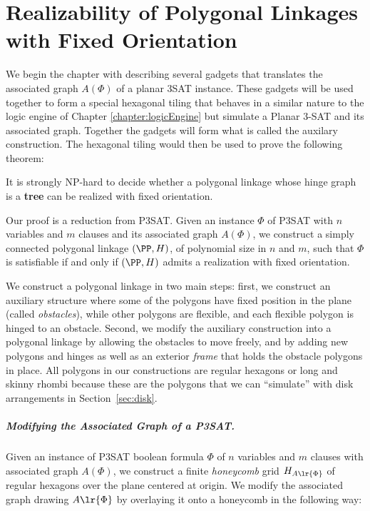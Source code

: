 \chapter{Realizability of Polygonal Linkages with Fixed Orientation\label{chapter:polygonalLinkage}}

We begin the chapter with describing several gadgets that translates the associated graph $A(\Phi)$ of a planar 3SAT instance.  
These gadgets will be used together to form a special hexagonal tiling that behaves in a similar nature to the logic engine of Chapter \ref{chapter:logicEngine} but simulate a Planar 3-SAT and its associated graph.
Together the gadgets will form what is called the auxilary construction.
The hexagonal tiling would then be used to prove the following theorem:
\begin{thm}\label{thm:hinge2}
It is strongly NP-hard to decide whether a polygonal linkage whose hinge graph is a \textbf{tree} can be realized with fixed orientation.
\end{thm}
Our proof is a reduction from P3SAT.
Given an instance $\Phi$ of P3SAT with $n$ variables and $m$ clauses and its associated graph $A(\Phi)$, we construct a simply connected polygonal linkage $(\PP,H)$, of polynomial size in $n$ and $m$, such that $\Phi$ is satisfiable if and only if $(\PP,H)$ admits a realization with fixed orientation. 

We construct a polygonal linkage  in two main steps: first, we construct an auxiliary structure where some of the polygons have fixed position in the plane (called \emph{obstacles}), while other polygons are flexible, and each flexible polygon is hinged to an obstacle. 
Second, we modify the auxiliary construction into a polygonal linkage by allowing the obstacles to move freely, and by adding new polygons and hinges as well as an exterior \emph{frame} that holds the obstacle polygons in place.
All polygons in our constructions are regular hexagons or long and skinny rhombi because these are the polygons that we can ``simulate'' with disk arrangements in Section~\ref{sec:disk}.
\paragraph{Modifying the Associated Graph of a P3SAT.}

Given an instance of P3SAT boolean formula $\Phi$ of $n$ variables and $m$ clauses with associated graph $A(\Phi)$, we construct a finite \textit{honeycomb} grid $H_{A \lr{\Phi}}$ of regular hexagons over the plane centered at origin.
We modify the associated graph drawing $A\lr{\Phi}$ by overlaying it onto a honeycomb in the following way:


